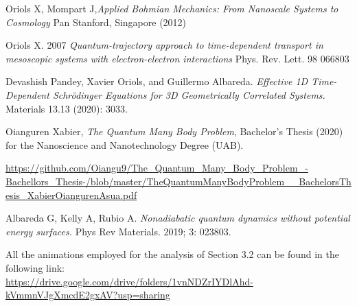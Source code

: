 \documentclass[11pt, a4paper]{article} %
\begin{document}
\begin{thebibliography}{1}

	Oriols X, Mompart J,{\em Applied Bohmian Mechanics: From Nanoscale Systems to Cosmology} Pan Stanford, Singapore (2012)
	
	Oriols X. 2007 {\em Quantum-trajectory approach to time-dependent transport in mesoscopic systems with electron-electron interactions} Phys. Rev. Lett. 98 066803

	Devashish Pandey, Xavier Oriols, and Guillermo Albareda. {\em Effective 1D Time-Dependent Schrödinger Equations for 3D Geometrically Correlated Systems.} Materials 13.13 (2020): 3033.

	Oianguren Xabier, {\em The Quantum Many Body Problem}, Bachelor's Thesis (2020) for the Nanoscience and Nanotechnology Degree (UAB).

\href{https://github.com/Oiangu9/The\_Quantum\_Many\_Body\_Problem\_-Bachellors\_Thesis-/blob/master/TheQuantumManyBodyProblem\_\_BachelorsThesis\_XabierOiangurenAsua.pdf}{https://github.com/Oiangu9/The\_Quantum\_Many\_Body\_Problem\_-Bachellors\_Thesis-/blob/master/TheQuantumManyBodyProblem\_\_BachelorsThesis\_XabierOiangurenAsua.pdf}

	Albareda G, Kelly A, Rubio A. {\em Nonadiabatic quantum dynamics without potential energy surfaces.} Phys Rev Materials. 2019; 3: 023803. 

	All the animations employed for the analysis of Section 3.2 can be found in the following link:\\
	\href{https://drive.google.com/drive/folders/1vnNDZrIYDlAhd-kVmmnVJgXmcdE2gxAV?usp=sharing}{https://drive.google.com/drive/folders/1vnNDZrIYDlAhd-kVmmnVJgXmcdE2gxAV?usp=sharing}
	
\end{thebibliography}
\end{document}
